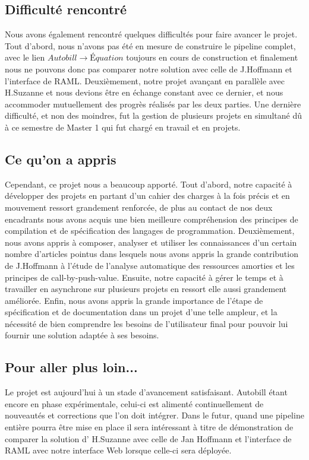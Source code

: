 \documentclass[12pt]{article}
\begin{document}
\subsection{Difficulté rencontré}\label{Difficulté-rencontré}

Nous avons également rencontré quelques difficultés pour faire avancer le projet.
Tout d'abord, nous n'avons pas été en mesure de construire le pipeline complet, avec le lien $Autobill \rightarrow Équation$ toujours en cours de construction et finalement nous ne pouvons donc pas comparer notre solution avec celle de J.Hoffmann et l'interface de RAML.
Deuxièmement, notre projet avançant en parallèle avec H.Suzanne et nous devions être en échange constant avec ce dernier, et nous accommoder mutuellement des progrès réalisés par les deux parties.
Une dernière difficulté, et non des moindres, fut la gestion de plusieurs projets en simultané dû à ce semestre de Master 1 qui fut chargé en travail et en projets.

\subsection{Ce qu'on a appris}\label{Ce qu'on a appris}
Cependant, ce projet nous a beaucoup apporté.
Tout d'abord, notre capacité à développer des projets en partant d'un cahier des charges à la fois précis et en mouvement ressort grandement renforcée, de plus au contact de nos deux encadrants nous avons acquis une bien meilleure compréhension des principes de compilation et de spécification des langages de programmation.
Deuxièmement, nous avons appris à composer, analyser et utiliser les connaissances d'un certain nombre d'articles pointus dans lesquels nous avons appris la grande contribution de J.Hoffmann à l'étude de l'analyse automatique des ressources amorties et les principes de call-by-push-value.
Ensuite, notre capacité à gérer le temps et à travailler en asynchrone sur plusieurs projets en ressort elle aussi grandement améliorée.
Enfin, nous avons appris la grande importance de l'étape de spécification et de documentation dans un projet d'une telle ampleur, et la nécessité de bien comprendre les besoins de l'utilisateur final pour pouvoir lui fournir une solution adaptée à ses besoins.

\subsection{Pour aller plus loin...}\label{Pour aller plus loin...}
Le projet est aujourd'hui à un stade d'avancement satisfaisant. Autobill étant
encore en phase expérimentale, celui-ci est alimenté continuellement de
nouveautés et corrections que l'on doit intégrer. 
Dans le futur, quand une pipeline entière pourra être mise en place il sera intéressant à titre de démonstration de comparer la solution d' H.Suzanne avec celle de Jan Hoffmann et l'interface de RAML
\cite{RAML} avec notre interface Web lorsque celle-ci sera déployée.
\textbf{}
\end{document}
